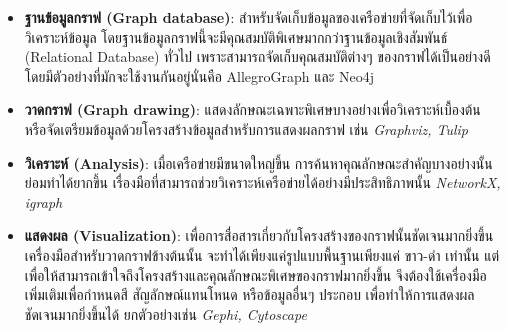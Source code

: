 \begin{itemize}
    \item \textbf{ฐานข้อมูลกราฟ (Graph database)}: สำหรับจัดเก็บข้อมูลของเครือข่ายที่จัดเก็บไว้เพื่อวิเคราะห์ข้อมูล 
    โดยฐานข้อมูลกราฟนี้จะมีคุณสมบัติพิเศษมากกว่าฐานข้อมูลเชิงสัมพันธ์ (Relational Database) ทั่วไป 
    เพราะสามารถจัดเก็บคุณสมบัติต่างๆ ของกราฟได้เป็นอย่างดี โดยมีตัวอย่างที่มักจะใช้งานกันอยู่นั่นคือ 
    AllegroGraph และ Neo4j

    \item \textbf{วาดกราฟ (Graph drawing)}: แสดงลักษณะเฉพาะพิเศษบางอย่างเพื่อวิเคราะห์เบื้องต้น
    หรือจัดเตรียมข้อมูลด้วยโครงสร้างข้อมูลสำหรับการแสดงผลกราฟ เช่น \textit{Graphviz, Tulip}

    \item \textbf{วิเคราะห์ (Analysis)}: เมื่อเครือข่ายมีขนาดใหญ่ขึ้น การค้นหาคุณลักษณะสำคัญบางอย่างนั้นย่อมทำได้ยากขึ้น 
    เรื่องมือที่สามารถช่วยวิเคราะห์เครือข่ายได้อย่างมีประสิทธิภาพนั้น \textit{NetworkX, igraph}

    \item \textbf{แสดงผล (Visualization)}: เพื่อการสื่อสารเกี่ยวกับโครงสร้างของกราฟนั้นชัดเจนมากยิ่งขึ้นเครื่องมือสำหรับวาดกราฟข้างต้นนั้น
    จะทำได้เพียงแค่รูปแบบพื้นฐานเพียงแค่ ขาว-ดำ เท่านั้น แต่เพื่อให้สามารถเข้าใจถึงโครงสร้างและคุณลักษณะพิเศษของกราฟมากยิ่งขึ้น
    จึงต้องใช้เครื่องมือเพิ่มเติมเพื่อกำหนดสี สัญลักษณ์แทนโหนด หรือข้อมูลอื่นๆ ประกอบ เพื่อทำให้การแสดงผลชัดเจนมากยิ่งขึ้นได้ ยกตัวอย่างเช่น \textit{Gephi, Cytoscape}
\end{itemize}